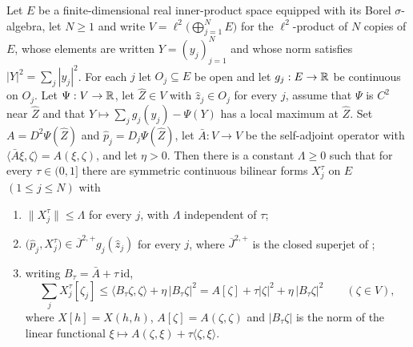 \begin{lemma}
Let $E$ be a finite-dimensional real inner-product space equipped with its Borel
$\sigma$-algebra, let $N\ge1$ and write $V=\ell^2\bigl(\bigoplus_{j=1}^NE\bigr)$
for the $\ell^2$-product of $N$ copies of $E$, whose elements are written
$Y=(y_j)_{j=1}^N$ and whose norm satisfies $|Y|^2=\sum_j|y_j|^2$. For each $j$
let $O_j\subseteq E$ be open and let $g_j:E\to\mathbb{R}$ be continuous on $O_j$. Let
$\Psi:V\to\mathbb{R}$, let $\widehat Z\in V$ with $\widehat z_j\in O_j$ for every $j$,
assume that $\Psi$ is $C^2$ near $\widehat Z$ and that
$Y\mapsto\sum_jg_j(y_j)-\Psi(Y)$ has a local maximum at $\widehat Z$. Set
$A=D^2\Psi(\widehat Z)$ and $\widehat p_j=D_j\Psi(\widehat Z)$, let
$\bar A:V\to V$ be the self-adjoint operator with
$\langle\bar A\xi,\zeta\rangle=A(\xi,\zeta)$, and let $\eta>0$. Then there is a
constant $\Lambda\ge0$ such that for every $\tau\in(0,1]$ there are symmetric
continuous bilinear forms $X_j^\tau$ on $E$ $(1\le j\le N)$ with
\begin{enumerate}
\item[(T1)] $\|X_j^\tau\|\le\Lambda$ for every $j$, with $\Lambda$ independent
  of $\tau$;
\item[(T2)] $\bigl(\widehat p_j,X_j^\tau\bigr)
  \in\overline J^{2,+}g_j(\widehat z_j)$ for every $j$, where
  $\overline J^{2,+}$ is the closed superjet of ;
\item[(T3)] writing $B_\tau=\bar A+\tau\,\mathrm{id}$,
  \[
    \sum_jX_j^\tau[\zeta_j]
     \le\langle B_\tau\zeta,\zeta\rangle+\eta\,|B_\tau\zeta|^2
     =A[\zeta]+\tau|\zeta|^2+\eta\,|B_\tau\zeta|^2\qquad(\zeta\in V),
  \]
  where $X[h]=X(h,h)$, $A[\zeta]=A(\zeta,\zeta)$ and $|B_\tau\zeta|$ is the
  norm of the linear functional $\xi\mapsto A(\zeta,\xi)+\tau\langle\zeta,\xi\rangle$.
\end{enumerate}
\end{lemma}
